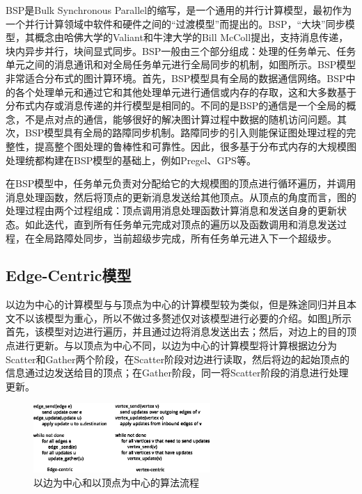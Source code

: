 BSP是Bulk Synchronous Parallel的缩写，是一个通用的并行计算模型，最初作为一个并行计算领域中软件和硬件之间的“过渡模型”而提出的。BSP，“大块”同步模型，其概念由哈佛大学的Valiant和牛津大学的Bill McColl提出，支持消息传递，块内异步并行，块间显式同步。BSP一般由三个部分组成：处理的任务单元、任务单元之间的消息通讯和对全局任务单元进行全局同步的机制，如图所示。BSP模型非常适合分布式的图计算环境。首先，BSP模型具有全局的数据通信网络。BSP中的各个处理单元和通过它和其他处理单元进行通信或内存的存取，这和大多数基于分布式内存或消息传递的并行模型是相同的。不同的是BSP的通信是一个全局的概念，不是点对点的通信，能够很好的解决图计算过程中数据的随机访问问题。其次，BSP模型具有全局的路障同步机制。路障同步的引入则能保证图处理过程的完整性，提高整个图处理的鲁棒性和可靠性。因此，很多基于分布式内存的大规模图处理统都构建在BSP模型的基础上，例如Pregel、GPS等。

在BSP模型中，任务单元负责对分配给它的大规模图的顶点进行循环遍历，并调用消息处理函数，然后将顶点的更新消息发送给其他顶点。从顶点的角度而言，图的处理过程由两个过程组成：顶点调用消息处理函数计算消息和发送自身的更新状态。如此迭代，直到所有任务单元完成对顶点的遍历以及函数调用和消息发送过程，在全局路障处同步，当前超级步完成，所有任务单元进入下一个超级步。

\subsection{Edge-Centric模型}
以边为中心的计算模型与与顶点为中心的计算模型较为类似，但是殊途同归并且本文不以该模型为重心，所以不做过多赘述仅对该模型进行必要的介绍。如图\ref{fig:evc}所示首先，该模型对边进行遍历，并且通过边将消息发送出去；然后，对边上的目的顶点进行更新。与以顶点为中心不同，以边为中心的计算模型将计算根据边分为Scatter和Gather两个阶段，在Scatter阶段对边进行读取，然后将边的起始顶点的信息通过边发送给目的顶点；在Gather阶段，同一将Scatter阶段的消息进行处理更新。

\begin{figure}[htbp]
\centering
\includegraphics[width=0.6\textwidth]{myfigures/edgevertexcentric.eps}
\caption{以边为中心和以顶点为中心的算法流程}\label{fig:evc}
\vspace{\baselineskip}
\end{figure}



